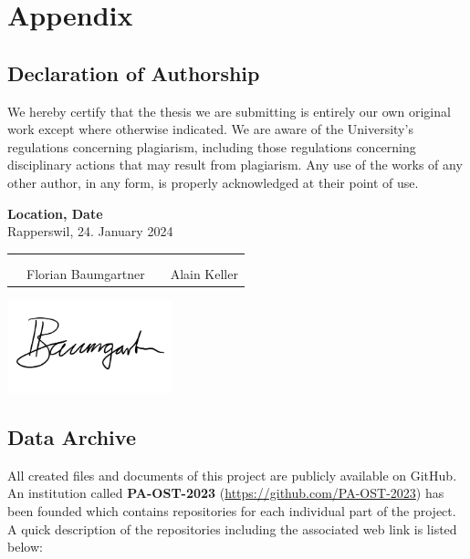 \chapter{Appendix}
\clearpage

\section{Declaration of Authorship} \label{Declaration of Authorship}
We hereby certify that the thesis we are submitting is entirely our own original work except where otherwise indicated.
We are aware of the University's regulations concerning plagiarism, including those regulations concerning disciplinary actions that may result from plagiarism.
Any use of the works of any other author, in any form, is properly acknowledged at their point of use.

\bigskip
\textbf{Location, Date} \\
Rapperswil, 24. January 2024

\vspace{1.2cm}
\begin{tabular}{@{}p{0.1cm}p{6cm}p{0.6cm}p{6cm}@{}}
	 & \hrulefill          &  & \hrulefill   \\ \\[-0.7em]
	 & Florian Baumgartner &  & Alain Keller \\
\end{tabular}

\includegraphics[width=4.8cm, align=t, smash=br, hshift=0.9cm, vshift=2.55cm]{appendix/Signature_Florian_Baumgartner.pdf}
\newpage

\section{Data Archive} \label{Data Archive}
All created files and documents of this project are publicly available on GitHub. An institution called \textbf{PA-OST-2023} (\url{https://github.com/PA-OST-2023}) has been founded which contains repositories for each individual part of the project.
A quick description of the repositories including the associated web link is listed below:


